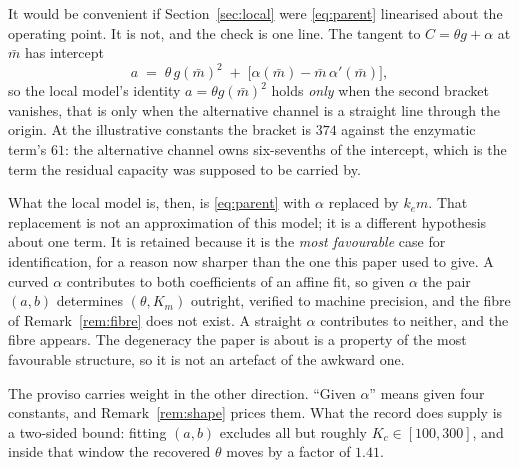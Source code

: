 \begin{remark}
\label{rem:not_a_reduction}
It would be convenient if Section~\ref{sec:local} were \eqref{eq:parent} linearised about
the operating point. It is not, and the check is one line. The tangent to
$C = \theta g + \alpha$ at $\bar m$ has intercept
\begin{equation}
a \;=\; \theta\, g(\bar m)^2 \;+\; \bigl[\alpha(\bar m) - \bar m\,\alpha'(\bar m)\bigr],
\label{eq:parent_intercept}
\end{equation}
so the local model's identity $a = \theta g(\bar m)^2$ holds \emph{only} when the second
bracket vanishes, that is only when the alternative channel is a straight line through the
origin. At the illustrative constants the bracket is $374$ against the enzymatic term's
$61$: the alternative channel owns six-sevenths of the intercept, which is the term
the residual capacity was supposed to be carried by.

What the local model is, then, is \eqref{eq:parent} with $\alpha$ replaced by $k_e m$. That
replacement is not an approximation of this model; it is a different hypothesis about one
term. It is retained because it is the \emph{most favourable} case for identification, for a
reason now sharper than the one this paper used to give. A curved $\alpha$ contributes to
both coefficients of an affine fit, so given $\alpha$ the pair $(a,b)$ determines
$(\theta, K_m)$ outright, verified to machine precision, and the fibre of
Remark~\ref{rem:fibre} does not exist. A straight $\alpha$ contributes to neither, and the
fibre appears. The degeneracy the paper is about is a property of the most favourable
structure, so it is not an artefact of the awkward one.

The proviso carries weight in the other direction. ``Given $\alpha$'' means given four
constants, and Remark~\ref{rem:shape} prices them. What the record does supply is a
two-sided bound: fitting $(a,b)$ excludes all but roughly $K_c \in [100, 300]$, and inside
that window the recovered $\theta$ moves by a factor of $1.41$.
\end{remark}

